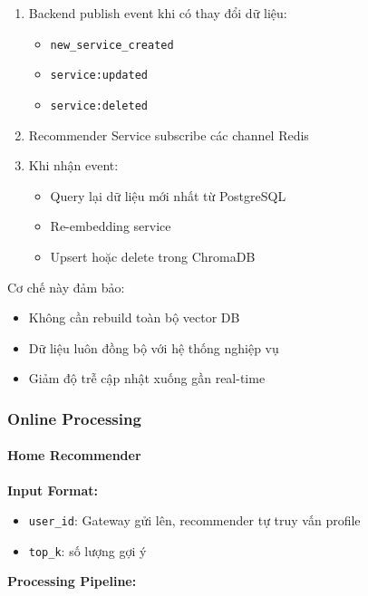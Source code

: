\begin{enumerate}
    \item Backend publish event khi có thay đổi dữ liệu:
    \begin{itemize}
        \item \texttt{new\_service\_created}
        \item \texttt{service:updated}
        \item \texttt{service:deleted}
    \end{itemize}
    \item Recommender Service subscribe các channel Redis
    \item Khi nhận event:
    \begin{itemize}
        \item Query lại dữ liệu mới nhất từ PostgreSQL
        \item Re-embedding service
        \item Upsert hoặc delete trong ChromaDB
    \end{itemize}
\end{enumerate}

Cơ chế này đảm bảo:
\begin{itemize}
    \item Không cần rebuild toàn bộ vector DB
    \item Dữ liệu luôn đồng bộ với hệ thống nghiệp vụ
    \item Giảm độ trễ cập nhật xuống gần real-time
\end{itemize}

\subsubsection{Online Processing}

\paragraph{Home Recommender}   

\textbf{Input Format:}
\begin{itemize}
    \item \texttt{user\_id}: Gateway gửi lên, recommender tự truy vấn profile
    \item \texttt{top\_k}: số lượng gợi ý
\end{itemize}

\textbf{Processing Pipeline:}

